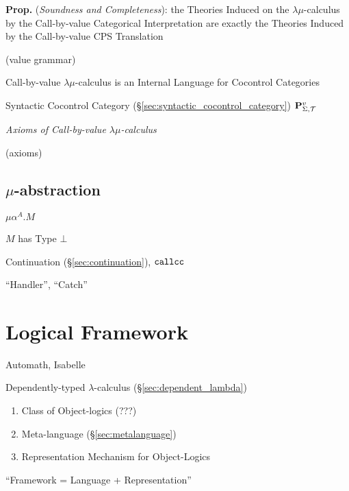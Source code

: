\textbf{Prop.} (\emph{Soundness and Completeness}): the Theories
Induced on the $\lambda\mu$-calculus by the Call-by-value Categorical
Interpretation are exactly the Theories Induced by the Call-by-value
CPS Translation

(value grammar) %

Call-by-value $\lambda\mu$-calculus is an Internal Language for
Cocontrol Categories

Syntactic Cocontrol Category
(\S\ref{sec:syntactic_cocontrol_category})
$\mathbf{P}^v_{\Sigma,\mathcal{T}}$ %


\emph{Axioms of Call-by-value $\lambda\mu$-calculus}

(axioms) %




\subsection{$\mu$-abstraction}\label{sec:mu_abstraction}

$\mu\alpha^A.M$

$M$ has Type $\bot$

Continuation (\S\ref{sec:continuation}), $\mathtt{callcc}$

``Handler'', ``Catch'' %



\section{Logical Framework}\label{sec:logical_framework}


Automath, Isabelle

Dependently-typed $\lambda$-calculus (\S\ref{sec:dependent_lambda})

\begin{enumerate}
  \item Class of Object-logics (???)
  \item Meta-language (\S\ref{sec:metalanguage})
  \item Representation Mechanism for Object-Logics
\end{enumerate}

``Framework = Language + Representation''




